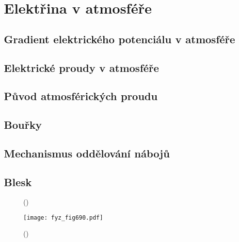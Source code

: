 \setchaptertoc
\chapter{Elektřina v atmosféře}\label{fyz:IIchapIX}

  \section{Gradient elektrického potenciálu v atmosféře}\label{fyz:IIchapIXsecI}
  \section{Elektrické proudy v atmosféře}\label{fyz:IIchapIXsecII}
  \section{Původ atmosférických proudu}\label{fyz:IIchapIXsecIII}
  \section{Bouřky}\label{fyz:IIchapIXsecIV}
  \section{Mechanismus oddělování nábojů}\label{fyz:IIchapIXsecV}
  \section{Blesk}\label{fyz:IIchapIXsecVI}

    \begin{figure}[ht!]
      \centering
                     \newline
      \caption{
               (\cite[s.~748]{Feynman02})}
      \label{fyz:fig689}
    \end{figure}

    \begin{figure}[ht!] %
      \centering
      \texttt{[image: fyz\_fig690.pdf]}
      \caption{
               (\cite[s.~707]{Feynman02})}
      \label{fyz:fig690}
    \end{figure}


